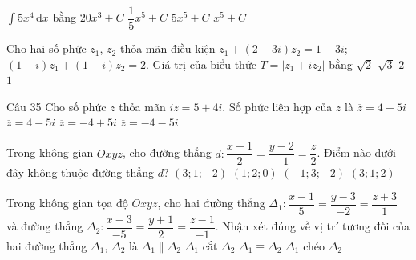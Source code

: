 \begin{ex}%
$\displaystyle\int\limits 5x^4 \mathrm{\,d}x$ bằng
\choice
{$20x^3+C$}
{$\dfrac{1}{5}x^5+C$}
{$5x^5+C$}
{\True $x^5+C$}
\end{ex}

\begin{ex}%
Cho hai số phức $z_1$, $z_2$ thỏa mãn điều kiện $z_1+(2+3i)z_2=1-3i$; $(1-i)z_1+(1+i)z_2=2$. Giá trị của biểu thức $T=\left|z_1+iz_2\right|$ bằng
\choice
{$\sqrt{2}$}
{$\sqrt{3}$}
{\True $2$}
{$1$}
\end{ex}

\begin{ex}Câu 35%
Cho số phức $z$ thỏa mãn $iz=5+4i$. Số phức liên hợp của $z$ là
\choice
{\True $\overline{z}=4+5i$}
{$\overline{z}=4-5i$}
{$\overline{z}=-4+5i$}
{$\overline{z}=-4-5i$}
\end{ex}

\begin{ex}%
Trong không gian $Oxyz$, cho đường thẳng $d\colon \dfrac{x-1}{2}=\dfrac{y-2}{-1}=\dfrac{z}{2}$. Điểm nào dưới đây không thuộc đường thẳng $d$?
\choice
{\True $\left(3;1;-2\right)$}
{$\left(1;2;0\right)$}
{$\left(-1;3;-2\right)$}
{$\left(3;1;2\right)$}
\end{ex}

\begin{ex}%
Trong không gian tọa độ $Oxyz$, cho hai đường thẳng $\Delta_1\colon \dfrac{x-1}{5}=\dfrac{y-3}{-2}=\dfrac{z+3}{1}$ và đường thẳng $\Delta_2\colon \dfrac{x-3}{-5}=\dfrac{y+1}{2}=\dfrac{z-1}{-1}$. Nhận xét đúng về vị trí tương đối của hai đường thẳng $\Delta_1$, $\Delta_2$ là
\choice
{\True $\Delta_1\parallel\Delta_2$}
{$\Delta_1$ cắt $\Delta_2$}
{$\Delta_1\equiv\Delta_2$}
{$\Delta_1$ chéo $\Delta_2$}
\end{ex}

